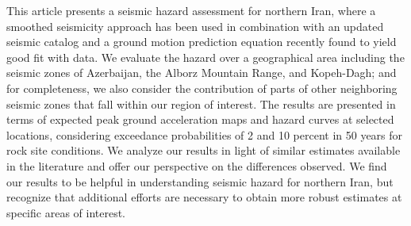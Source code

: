 %
This article presents a seismic hazard assessment for northern Iran, where a smoothed seismicity approach has been used in combination with an updated seismic catalog and a ground motion prediction equation recently found to yield good fit with data. We evaluate the hazard over a geographical area including the seismic zones of Azerbaijan, the Alborz Mountain Range, and Kopeh-Dagh; and for completeness, we also consider the contribution of parts of other neighboring seismic zones that fall within our region of interest.  The results are presented in terms of expected peak ground acceleration maps and hazard curves at selected locations, considering exceedance probabilities of 2 and 10 percent in 50 years for rock site conditions.  We analyze our results in light of similar estimates available in the literature and offer our perspective on the differences observed. We find our results to be helpful in understanding seismic hazard for northern Iran, but recognize that additional efforts are necessary to obtain more robust estimates at specific areas of interest.
